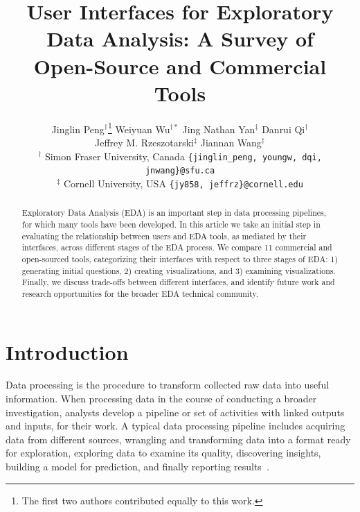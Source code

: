 \documentclass[11pt]{article}
\begin{document}
\title{User Interfaces for Exploratory Data Analysis: A Survey of \\ Open-Source and Commercial Tools}

\author{Jinglin Peng$^{\dagger}$\thanks{ The ﬁrst two authors contributed equally to this work.} 
\hspace{2em} Weiyuan Wu$^{\dagger*}$ 
\hspace{2em} Jing Nathan Yan$^{\ddagger}$ 
\hspace{1em} Danrui Qi$^{\dagger}$ 
\hspace{1em} \\
Jeffrey M. Rzeszotarski$^{\ddagger}$ \hspace{1em} Jiannan Wang$^{\dagger}$\\
$^{\dagger}$ Simon Fraser University, Canada \hspace{1em} \texttt{\small\{jinglin\_peng, youngw, dqi, jnwang\}@sfu.ca}\\
$^{\ddagger}$ Cornell University, USA \hspace{1em} \texttt{\small\{jy858, jeffrz\}@cornell.edu}
}

\maketitle



\begin{abstract}
    Exploratory Data Analysis (EDA) is an important step in data processing pipelines, for which many tools have been developed. In this article we take an initial step in evaluating the relationship between users and EDA tools, as mediated by their interfaces, across different stages of the EDA process. We compare 11 commercial and open-sourced tools, categorizing their interfaces with respect to three stages of EDA: 1) generating initial questions, 2) creating visualizations, and 3) examining visualizations. Finally, we discuss trade-offs between different interfaces, and identify future work and research opportunities for the broader EDA technical community. 
\end{abstract}


\section{Introduction}

Data processing is the procedure to transform collected raw data into useful information. When processing data in the course of conducting a broader investigation, analysts develop a pipeline or set of activities with linked outputs and inputs, for their work. 
A typical data processing pipeline includes acquiring data from different sources, wrangling and transforming data into a format ready for exploration, exploring data to examine its quality, discovering insights, building a model for prediction, and finally reporting results~\cite{DBLP:journals/corr/abs-1911-00568}. 
\end{document}
